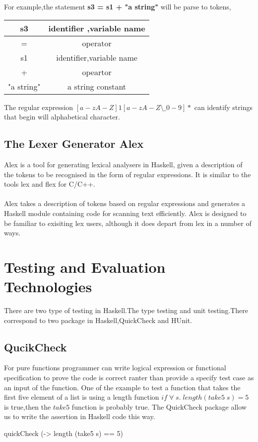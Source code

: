 For example,the statement \textbf{s3 = s1 + "a string"} will be parse to tokens,

\begin{tabular}{|c|c|}
\hline s3 & identifier ,variable name \\ 
\hline = & operator \\ 
\hline s1 & identifier,variable name \\ 
\hline + & opeartor \\ 
\hline "a string" & a string constant \\ 
\hline 
\end{tabular} 

The regular expression $ [a-zA-Z]{1}[a-zA-Z\setminus\_0-9]*  $ can identify strings that begin will alphabetical character.


\subsection{The Lexer Generator Alex}
Alex is a tool for generating lexical analysers in Haskell, given a description of the tokens to be recognised in the form of regular expressions. It is similar to the tools lex and flex for C/C++.
\\\\
Alex takes a description of tokens based on regular expressions and generates a Haskell module containing code for scanning text efficiently. Alex is designed to be familiar to exisiting lex users, although it does depart from lex in a number of ways.\cite{alex}

\section{Testing and Evaluation Technologies}
There are two type of testing in Haskell.The type testing and unit testing.There correspond to two package in Haskell,QuickCheck and HUnit.
\subsection*{QucikCheck}
For pure functions programmer can write logical expression or functional specification to prove the code is correct ranter than provide a specify test case as an input of the function.
One of the example to test a function that takes the first five element of a list is using a length function $ if \;\forall \;s.\; length(take5 \;s) = 5 \;$ is true,then the $take5$ function is probably true.
The QuickCheck package allow us to write the assertion in Haskell code this way.
\begin{hcode}
quickCheck (\s -> length (take5 s) == 5)
\end{hcode}

